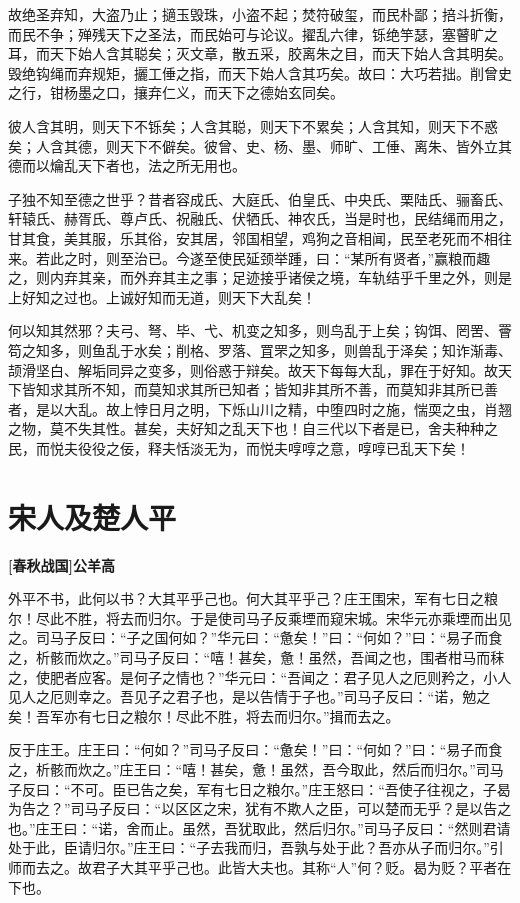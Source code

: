 \documentclass[UTF8,titlepage,oneside]{ctexbook}
\begin{document}
故绝圣弃知，大盗乃止；擿玉毁珠，小盗不起；焚符破玺，而民朴鄙；掊斗折衡，而民不争；殚残天下之圣法，而民始可与论议。擢乱六律，铄绝竽瑟，塞瞽旷之耳，而天下始人含其聪矣；灭文章，散五采，胶离朱之目，而天下始人含其明矣。毁绝钩绳而弃规矩，攦工倕之指，而天下始人含其巧矣。故曰：大巧若拙。削曾史之行，钳杨墨之口，攘弃仁义，而天下之德始玄同矣。

彼人含其明，则天下不铄矣；人含其聪，则天下不累矣；人含其知，则天下不惑矣；人含其德，则天下不僻矣。彼曾、史、杨、墨、师旷、工倕、离朱、皆外立其德而以爚乱天下者也，法之所无用也。

子独不知至德之世乎？昔者容成氏、大庭氏、伯皇氏、中央氏、栗陆氏、骊畜氏、轩辕氏、赫胥氏、尊卢氏、祝融氏、伏牺氏、神农氏，当是时也，民结绳而用之，甘其食，美其服，乐其俗，安其居，邻国相望，鸡狗之音相闻，民至老死而不相往来。若此之时，则至治已。今遂至使民延颈举踵，曰：“某所有贤者，”赢粮而趣之，则内弃其亲，而外弃其主之事；足迹接乎诸侯之境，车轨结乎千里之外，则是上好知之过也。上诚好知而无道，则天下大乱矣！

何以知其然邪？夫弓、弩、毕、弋、机变之知多，则鸟乱于上矣；钩饵、罔罟、罾笱之知多，则鱼乱于水矣；削格、罗落、罝罘之知多，则兽乱于泽矣；知诈渐毒、颉滑坚白、解垢同异之变多，则俗惑于辩矣。故天下每每大乱，罪在于好知。故天下皆知求其所不知，而莫知求其所已知者；皆知非其所不善，而莫知非其所已善者，是以大乱。故上悖日月之明，下烁山川之精，中堕四时之施，惴耎之虫，肖翘之物，莫不失其性。甚矣，夫好知之乱天下也！自三代以下者是已，舍夫种种之民，而悦夫役役之佞，释夫恬淡无为，而悦夫啍啍之意，啍啍已乱天下矣！


\chapter*{宋人及楚人平}
\begin{center}
	\textbf{[春秋战国]公羊高}
\end{center}

外平不书，此何以书？大其平乎己也。何大其平乎己？庄王围宋，军有七日之粮尔！尽此不胜，将去而归尔。于是使司马子反乘堙而窥宋城。宋华元亦乘堙而出见之。司马子反曰：“子之国何如？”华元曰：“惫矣！”曰：“何如？”曰：“易子而食之，析骸而炊之。”司马子反曰：“嘻！甚矣，惫！虽然，吾闻之也，围者柑马而秣之，使肥者应客。是何子之情也？”华元曰：“吾闻之：君子见人之厄则矜之，小人见人之厄则幸之。吾见子之君子也，是以告情于子也。”司马子反曰：“诺，勉之矣！吾军亦有七日之粮尔！尽此不胜，将去而归尔。”揖而去之。

反于庄王。庄王曰：“何如？”司马子反曰：“惫矣！”曰：“何如？”曰：“易子而食之，析骸而炊之。”庄王曰：“嘻！甚矣，惫！虽然，吾今取此，然后而归尔。”司马子反曰：“不可。臣已告之矣，军有七日之粮尔。”庄王怒曰：“吾使子往视之，子曷为告之？”司马子反曰：“以区区之宋，犹有不欺人之臣，可以楚而无乎？是以告之也。”庄王曰：“诺，舍而止。虽然，吾犹取此，然后归尔。”司马子反曰：“然则君请处于此，臣请归尔。”庄王曰：“子去我而归，吾孰与处于此？吾亦从子而归尔。”引师而去之。故君子大其平乎己也。此皆大夫也。其称“人”何？贬。曷为贬？平者在下也。
\end{document}
